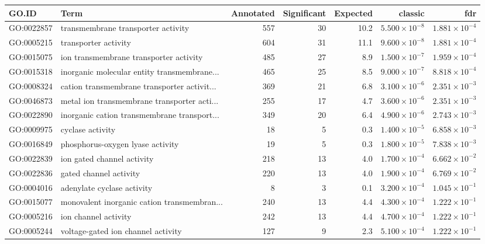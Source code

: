 \begin{table}[ht]
\centering
\begin{tabular}{llrrrrr}
  \hline
GO.ID & Term & Annotated & Significant & Expected & classic & fdr \\ 
  \hline
GO:0022857 & transmembrane transporter activity & 557 & 30 & 10.2 & $5.500 \times 10^{-8}$ & $1.881 \times 10^{-4}$ \\ 
  GO:0005215 & transporter activity & 604 & 31 & 11.1 & $9.600 \times 10^{-8}$ & $1.881 \times 10^{-4}$ \\ 
  GO:0015075 & ion transmembrane transporter activity & 485 & 27 & 8.9 & $1.500 \times 10^{-7}$ & $1.959 \times 10^{-4}$ \\ 
  GO:0015318 & inorganic molecular entity transmembrane... & 465 & 25 & 8.5 & $9.000 \times 10^{-7}$ & $8.818 \times 10^{-4}$ \\ 
  GO:0008324 & cation transmembrane transporter activit... & 369 & 21 & 6.8 & $3.100 \times 10^{-6}$ & $2.351 \times 10^{-3}$ \\ 
  GO:0046873 & metal ion transmembrane transporter acti... & 255 & 17 & 4.7 & $3.600 \times 10^{-6}$ & $2.351 \times 10^{-3}$ \\ 
  GO:0022890 & inorganic cation transmembrane transport... & 349 & 20 & 6.4 & $4.900 \times 10^{-6}$ & $2.743 \times 10^{-3}$ \\ 
  GO:0009975 & cyclase activity & 18 & 5 & 0.3 & $1.400 \times 10^{-5}$ & $6.858 \times 10^{-3}$ \\ 
  GO:0016849 & phosphorus-oxygen lyase activity & 19 & 5 & 0.3 & $1.800 \times 10^{-5}$ & $7.838 \times 10^{-3}$ \\ 
  GO:0022839 & ion gated channel activity & 218 & 13 & 4.0 & $1.700 \times 10^{-4}$ & $6.662 \times 10^{-2}$ \\ 
  GO:0022836 & gated channel activity & 220 & 13 & 4.0 & $1.900 \times 10^{-4}$ & $6.769 \times 10^{-2}$ \\ 
  GO:0004016 & adenylate cyclase activity & 8 & 3 & 0.1 & $3.200 \times 10^{-4}$ & $1.045 \times 10^{-1}$ \\ 
  GO:0015077 & monovalent inorganic cation transmembran... & 240 & 13 & 4.4 & $4.300 \times 10^{-4}$ & $1.222 \times 10^{-1}$ \\ 
  GO:0005216 & ion channel activity & 242 & 13 & 4.4 & $4.700 \times 10^{-4}$ & $1.222 \times 10^{-1}$ \\ 
  GO:0005244 & voltage-gated ion channel activity & 127 & 9 & 2.3 & $5.100 \times 10^{-4}$ & $1.222 \times 10^{-1}$ \\ 

\end{tabular}
\end{table}
